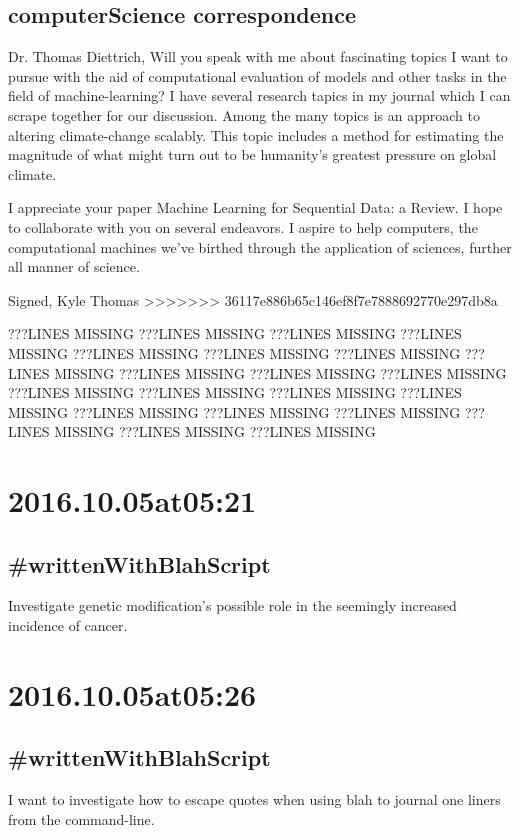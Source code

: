 \begin{enumerate}
\begin{enumerate}
\subsection*{computerScience correspondence}
Dr. Thomas Diettrich,
Will you speak with me about fascinating topics I want to pursue with the aid of computational evaluation of models and other tasks in the field of machine-learning? I have several research tapics in my journal which I can scrape together for our discussion. Among the many topics is an approach to altering climate-change scalably. This topic includes a method for estimating the magnitude of what might turn out to be humanity's greatest pressure on global climate.

I appreciate your paper Machine Learning for Sequential Data: a Review. I hope to collaborate with you on several endeavors. I aspire to help computers, the computational machines we've birthed through the application of sciences, further all manner of science.

Signed,
Kyle Thomas
>>>>>>> 36117e886b65c146ef8f7e7888692770e297db8a

???LINES MISSING
???LINES MISSING
???LINES MISSING
???LINES MISSING
???LINES MISSING
???LINES MISSING
???LINES MISSING
???LINES MISSING
???LINES MISSING
???LINES MISSING
???LINES MISSING
???LINES MISSING
???LINES MISSING
???LINES MISSING
???LINES MISSING
???LINES MISSING
???LINES MISSING
???LINES MISSING
???LINES MISSING
???LINES MISSING
???LINES MISSING

\section*{ 2016.10.05at05:21 }
\subsection*{ #writtenWithBlahScript }
Investigate genetic modification's possible role in the seemingly increased incidence of cancer.

\section*{ 2016.10.05at05:26 }
\subsection*{ #writtenWithBlahScript }
I want to investigate how to escape quotes when using blah to journal one liners from the command-line.


\end{enumerate}
\end{enumerate}
